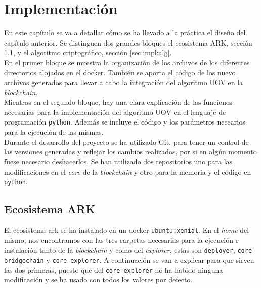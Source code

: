 \chapter{Implementación}
\label{sec:implementacion}

En este capítulo se va a detallar cómo se ha llevado a la práctica el diseño del capítulo anterior. Se distinguen dos grandes bloques el ecosistema ARK, sección \ref{sec:impl:eco}, y el algoritmo criptográfico, sección \ref{sec:impl:alg}.\\

En el primer bloque se muestra la organización de los archivos de los diferentes directorios alojados en el docker. También se aporta el código de los nuevo archivos generados para llevar a cabo la integración del algoritmo UOV en la \textit{blockchain}.\\

Mientras en el segundo bloque, hay una clara explicación de las funciones necesarias para la implementación del algoritmo UOV en el lenguaje de programación \texttt{python}. Además se incluye el código y los parámetros necearios para la ejecución de las mismas.\\


Durante el desarrollo del proyecto se ha utilizado Git, para tener un control de las versiones generadas y reflejar los cambios realizados, por si en algún momento fuese necesario deshacerlos. Se han utilizado dos repositorios uno para las modificaciones en el \textit{core} de la \textit{blockchain}\cite{core-mv} y otro para la memoria y el código en \texttt{python}\cite{git-mv}.

\section{Ecosistema ARK}\label{sec:impl:eco}

El ecosistema ark se ha instalado en un docker \texttt{ubuntu:xenial}. En el \textit{home} del mismo, nos encontramos con las tres carpetas necesarias para la ejecución e instalación tanto de la \textit{blockchain} y como del \textit{explorer}, estas son \texttt{deployer}, \texttt{core-bridgechain} y \texttt{core-explorer}. A continuación se van a explicar para que sirven las dos primeras, puesto que del \texttt{core-explorer} no ha habido ninguna modificación y se ha usado con todos los valores por defecto.\\



